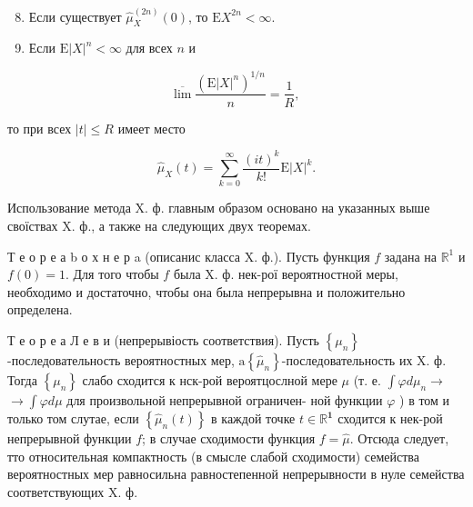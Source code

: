 \documentclass[10pt]{article}
\begin{document}
\begin{enumerate}

  \setcounter{enumi}{7}

  \item Если существует $\hat{\mu}_{X}^{(2 n)}(0)$, то $\mathrm{E} X^{2 n}<\infty$.



  \item Если $\mathrm{E}|X|^{n}<\infty$ для всех $n$ и



\end{enumerate}



\[

\overline{\lim } \frac{\left(\mathrm{E}|X|^{n}\right)^{1 / n}}{n}=\frac{1}{R} \text {, }

\]



то при всех $|t| \leqslant R$ имеет место



\[

\hat{\mu}_{X}(t)=\sum_{k=0}^{\infty} \frac{(i t)^{k}}{k !} \mathrm{E}|X|^{k} .

\]



Использование метода X. ф. главным образом основано на указанных выше своїствах X. ф., а также на следующих двух теоремах.



Т е о р е а b о х н е р a (описанис класса $\mathrm{X}$. ф.). Пусть функция $f$ задана на $\mathbb{R}^{1}$ и $f(0)=1$. Для того чтобы $f$ была X. ф. нек-рої вероятностной меры, необходимо и достаточно, чтобы она была непрерывна и положительно определена.



Т е о р е а Л е в и (непрерывіость соответствия). Пусть $\left\{\mu_{n}\right\}$-последовательность вероятностных мер, $\mathrm{a}\left\{\hat{\mu}_{n}\right\}$-последовательность их X. ф. Тогда $\left\{\mu_{n}\right\}$ слабо сходится к нск-рой вероятцослной мере $\mu$ (т. е. $\int \varphi d \mu_{n} \rightarrow$ $\rightarrow \int \varphi d \mu$ для произвольной непрерывной ограничен- ной функции $\varphi$ ) в том и только том слутае, если $\left\{\hat{\mu}_{n}(t)\right\}$ в каждой точке $t \in \mathbb{R}^{\mathbf{1}}$ сходится к нек-рой непрерывной функции $f$; в случае сходимости функция $f=\hat{\mu}$. Отсюда следует, тто относительная компактность (в смысле слабой сходимости) семейства вероятностных мер равносильна равностепенной непрерывности в нуле семейства соответствующих X. ф.
\end{document}
